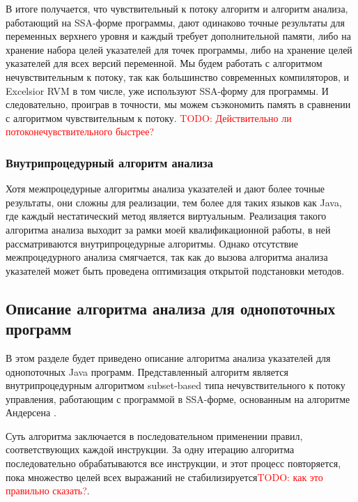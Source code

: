 \documentclass[14pt,titlepage]{extarticle}
\newcommand{\todo}[1]{\textcolor{red}{\eng{TODO}: #1}}
\newcommand{\eng}[1]{{\English#1}}
\begin{document}
      В итоге получается, что чувствительный к потоку алгоритм и алгоритм
      анализа, работающий на SSA-форме программы, дают
      одинаково точные результаты для переменных верхнего уровня и каждый
      требует дополнительной памяти, либо
      на хранение набора целей указателей для точек программы, либо на хранение
      целей указателей для всех версий переменной.
      Мы будем работать с алгоритмом нечувствительным к потоку, так как
      большинство современных компиляторов, и \eng{Excelsior RVM} в том числе,
      уже используют SSA-форму для программы. И следовательно, проиграв в
      точности, мы можем съэкономить память в сравнении с алгоритмом
      чувствительным к потоку.
      \todo{Действительно ли потоконечувствительного быстрее?}

    \subsubsection{Внутрипроцедурный алгоритм анализа}

      Хотя межпроцедурные алгоритмы анализа указателей и дают более точные
      результаты, они сложны для реализации, тем более для таких
      языков как Java, где каждый нестатический метод является виртуальным.
      Реализация такого алгоритма анализа выходит за рамки моей
      квалификационной работы, в ней рассматриваются внутрипроцедурные
      алгоритмы. Однако отсутствие межпроцедурного анализа смягчается, так
      как до вызова алгоритма анализа указателей может быть проведена
      оптимизация открытой подстановки методов.

    \subsection{Описание алгоритма анализа для однопоточных программ}
      \label{section:detailed_algorithm}

      В этом разделе будет приведено описание алгоритма анализа указателей
      для однопоточных Java программ.
      Представленный алгоритм является внутрипроцедурным алгоритмом
      \eng{subset-based} типа нечувствительного к потоку управления,
      работающим с программой в SSA-форме, основанным на алгоритме Андерсена
      \cite{andersen}.

      Суть алгоритма заключается в последовательном применении правил,
      соответствующих каждой инструкции. За одну итерацию алгоритма
      последовательно обрабатываются все инструкции, и этот процесс
      повторяется, пока множество целей всех выражаний не
      стабилизируется\todo{как это правильно сказать?}.
\end{document}
